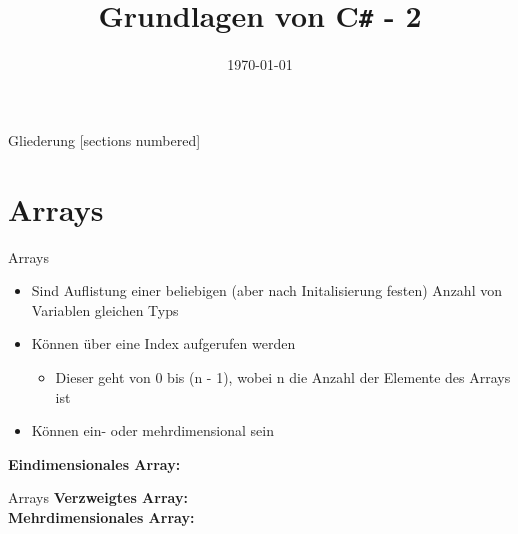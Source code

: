 



\title{Grundlagen von C\texttt{\#} - 2}
\date{\today}




\maketitle

\begin{frame}{Gliederung}
	[sections numbered]
	\tableofcontents
\end{frame}

\section{Arrays}
\begin{frame}{Arrays}
	\begin{itemize}
		\item Sind Auflistung einer beliebigen (aber nach Initalisierung festen) Anzahl von Variablen gleichen Typs
		\item Können über eine Index aufgerufen werden
		\begin{itemize}
			\item Dieser geht von 0 bis (n - 1), wobei n die Anzahl der Elemente des Arrays ist
		\end{itemize}
		\item Können ein- oder mehrdimensional sein
	\end{itemize}
	\textbf{Eindimensionales Array:}\\
		
\end{frame}

\begin{frame}{Arrays}
	\textbf{Verzweigtes Array:}\\
	
	\textbf{Mehrdimensionales Array:}\\
		
\end{frame}

